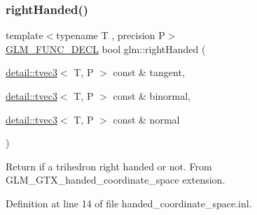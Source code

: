 \subsubsection{\texorpdfstring{right\+Handed()}{rightHanded()}}
{\footnotesize\ttfamily template$<$typename T , precision P$>$ \\
\hyperlink{setup_8hpp_ab2d052de21a70539923e9bcbf6e83a51}{G\+L\+M\+\_\+\+F\+U\+N\+C\+\_\+\+D\+E\+CL} bool glm\+::right\+Handed (\begin{DoxyParamCaption}\item[{\hyperlink{structglm_1_1detail_1_1tvec3}{detail\+::tvec3}$<$ T, P $>$ const \&}]{tangent,  }\item[{\hyperlink{structglm_1_1detail_1_1tvec3}{detail\+::tvec3}$<$ T, P $>$ const \&}]{binormal,  }\item[{\hyperlink{structglm_1_1detail_1_1tvec3}{detail\+::tvec3}$<$ T, P $>$ const \&}]{normal }\end{DoxyParamCaption})}

Return if a trihedron right handed or not. From G\+L\+M\+\_\+\+G\+T\+X\+\_\+handed\+\_\+coordinate\+\_\+space extension. 

Definition at line 14 of file handed\+\_\+coordinate\+\_\+space.\+inl.

